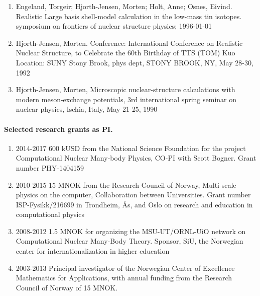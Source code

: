 \documentclass[%
oneside,                 %
final,                   %
10pt]{article}
\begin{document}
\begin{enumerate}
\item Engeland, Torgeir; Hjorth-Jensen, Morten; Holt, Anne; Osnes, Eivind. Realistic Large basis shell-model calculation in the low-mass tin isotopes. symposium on frontiers of nuclear structure physics; 1996-01-01

\item Hjorth-Jensen, Morten.  Conference: International Conference on Realistic Nuclear Structure, to Celebrate the 60th Birthday of TTS (TOM) Kuo Location: SUNY Stony Brook, phys dept, STONY BROOK, NY, May 28-30, 1992

\item Hjorth-Jensen, Morten,  Microscopic nuclear-structure calculations with modern meson-exchange potentials, 3rd international spring seminar on nuclear physics, Ischia, Italy, May 21-25, 1990
\end{enumerate}

\noindent
\paragraph{Selected research grants as PI.}
\begin{enumerate}
\item 2014-2017 600 kUSD from the National Science Foundation for the project Computational Nuclear Many-body Physics, CO-PI with Scott Bogner. Grant number PHY-1404159

\item 2010-2015 15 MNOK from the Research Council of Norway, Multi-scale physics on the computer, Collaboration between Universities. Grant number ISP-Fysikk/216699 in Trondheim, Ås, and Oslo on research and education in computational physics

\item 2008-2012 1.5 MNOK for organizing the MSU-UT/ORNL-UiO network on Computational Nuclear Many-Body Theory. Sponsor, SiU, the Norwegian center for internationalization in higher education

\item 2003-2013 Principal investigator of the Norwegian Center of Excellence Mathematics for Applications, with annual funding from the Research Council of Norway of 15 MNOK.
\end{enumerate}

\noindent

\end{document}
